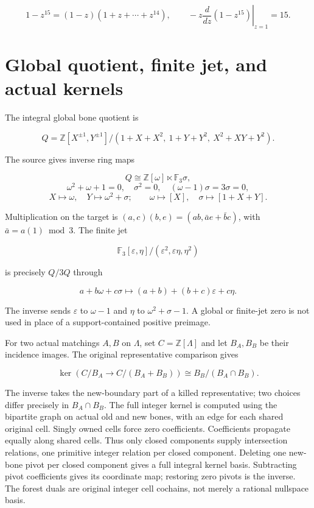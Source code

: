 \documentclass[
  10pt,
]{scrreprt}
\begin{document}
\[1-z^{15}=(1-z)(1+z+\cdots+z^{14}),\qquad
-\left.z\frac{d}{dz}(1-z^{15})\right|_{z=1}=15.\]

\section{Global quotient, finite jet, and actual
kernels}\label{global-quotient-finite-jet-and-actual-kernels}

The integral global bone quotient is

\[Q=\mathbb Z[X^{\pm1},Y^{\pm1}]/(1+X+X^2,\ 1+Y+Y^2,\ X^2+XY+Y^2).\]

The source gives inverse ring maps

\[Q\cong\mathbb Z[\omega]\ltimes\mathbb F_3\sigma,\]
\[\omega^2+\omega+1=0,\quad \sigma^2=0,\quad(\omega-1)\sigma=3\sigma=0,\]
\[X\mapsto\omega,\quad Y\mapsto\omega^2+\sigma;
\qquad\omega\mapsto[X],\quad\sigma\mapsto[1+X+Y].\]

Multiplication on the target is \((a,c)(b,e)=(ab,\bar a e+\bar b c)\),
with \(\bar a=a(1)\bmod3\). The finite jet

\[\mathbb F_3[\varepsilon,\eta]/(\varepsilon^2,\varepsilon\eta,\eta^2)\]

is precisely \(Q/3Q\) through

\[a+b\omega+c\sigma\mapsto(a+b)+(b+c)\varepsilon+c\eta.\]

The inverse sends \(\varepsilon\) to \(\omega-1\) and \(\eta\) to
\(\omega^2+\sigma-1\). A global or finite-jet zero is not used in place
of a support-contained positive preimage.

For two actual matchings \(A,B\) on \(\Lambda\), set
\(C=\mathbb Z[\Lambda]\) and let \(B_A,B_B\) be their incidence images.
The original representative comparison gives

\[\ker(C/B_A\to C/(B_A+B_B))\cong B_B/(B_A\cap B_B).\]

The inverse takes the new-boundary part of a killed representative; two
choices differ precisely in \(B_A\cap B_B\). The full integer kernel is
computed using the bipartite graph on actual old and new bones, with an
edge for each shared original cell. Singly owned cells force zero
coefficients. Coefficients propagate equally along shared cells. Thus
only closed components supply intersection relations, one primitive
integer relation per closed component. Deleting one new-bone pivot per
closed component gives a full integral kernel basis. Subtracting pivot
coefficients gives its coordinate map; restoring zero pivots is the
inverse. The forest duals are original integer cell cochains, not merely
a rational nullspace basis.
\end{document}
